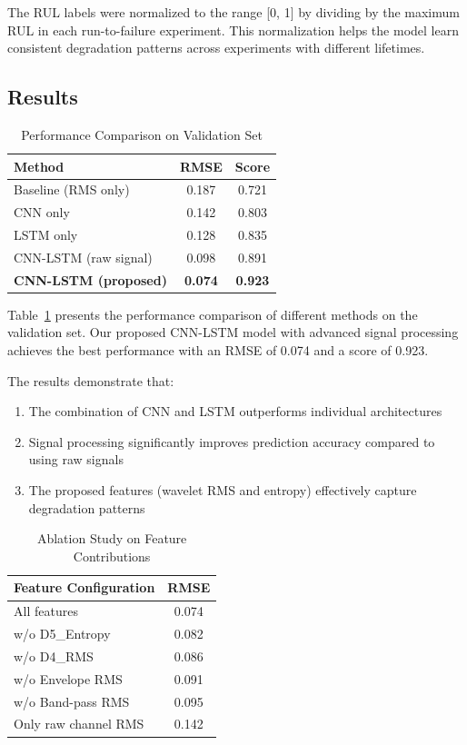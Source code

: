 \documentclass[conference,twocolumn]{IEEEtran}
\begin{document}
The RUL labels were normalized to the range [0, 1] by dividing by the maximum RUL in each run-to-failure experiment. This normalization helps the model learn consistent degradation patterns across experiments with different lifetimes.

\subsection{Results}

\begin{table}[t]
\centering
\caption{Performance Comparison on Validation Set}
\label{tab:results}
\begin{tabular}{lcc}
\toprule
\textbf{Method} & \textbf{RMSE} & \textbf{Score} \\
\midrule
Baseline (RMS only) & 0.187 & 0.721 \\
CNN only & 0.142 & 0.803 \\
LSTM only & 0.128 & 0.835 \\
CNN-LSTM (raw signal) & 0.098 & 0.891 \\
\textbf{CNN-LSTM (proposed)} & \textbf{0.074} & \textbf{0.923} \\
\bottomrule
\end{tabular}
\end{table}

Table~\ref{tab:results} presents the performance comparison of different methods on the validation set. Our proposed CNN-LSTM model with advanced signal processing achieves the best performance with an RMSE of 0.074 and a score of 0.923.

The results demonstrate that:
\begin{enumerate}
    \item The combination of CNN and LSTM outperforms individual architectures
    \item Signal processing significantly improves prediction accuracy compared to using raw signals
    \item The proposed features (wavelet RMS and entropy) effectively capture degradation patterns
\end{enumerate}

\begin{table}[t]
\centering
\caption{Ablation Study on Feature Contributions}
\label{tab:ablation}
\begin{tabular}{lc}
\toprule
\textbf{Feature Configuration} & \textbf{RMSE} \\
\midrule
All features & 0.074 \\
w/o D5\_Entropy & 0.082 \\
w/o D4\_RMS & 0.086 \\
w/o Envelope RMS & 0.091 \\
w/o Band-pass RMS & 0.095 \\
Only raw channel RMS & 0.142 \\
\bottomrule
\end{tabular}
\end{table}
\end{document}

